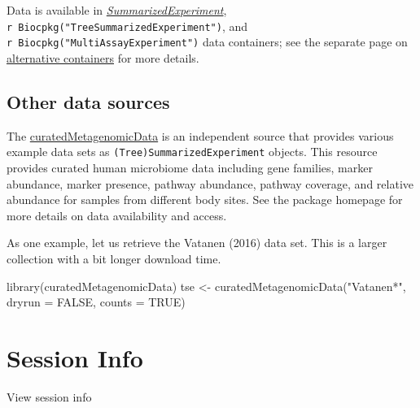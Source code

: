 \documentclass[
]{book}
\newenvironment{Shaded}{\begin{snugshade}}{\end{snugshade}}
\newcommand{\AttributeTok}[1]{\textcolor[rgb]{0.77,0.63,0.00}{#1}}
\newcommand{\ConstantTok}[1]{\textcolor[rgb]{0.00,0.00,0.00}{#1}}
\newcommand{\FunctionTok}[1]{\textcolor[rgb]{0.00,0.00,0.00}{#1}}
\newcommand{\NormalTok}[1]{#1}
\newcommand{\OtherTok}[1]{\textcolor[rgb]{0.56,0.35,0.01}{#1}}
\newcommand{\StringTok}[1]{\textcolor[rgb]{0.31,0.60,0.02}{#1}}
\begin{document}
Data is available in \emph{\href{https://bioconductor.org/packages/3.15/SummarizedExperiment}{SummarizedExperiment}}, \texttt{r\ Biocpkg("TreeSummarizedExperiment")}, and \texttt{r\ Biocpkg("MultiAssayExperiment")} data containers; see the separate
page on \href{https://microbiome.github.io/OMA/multitable.html}{alternative
containers} for more
details.

\hypertarget{other-data-sources}{%
\subsection{Other data sources}\label{other-data-sources}}

The
\href{https://waldronlab.io/curatedMetagenomicData}{curatedMetagenomicData}
is an independent source that provides various example data sets as
\texttt{(Tree)SummarizedExperiment} objects. This resource provides curated
human microbiome data including gene families, marker abundance,
marker presence, pathway abundance, pathway coverage, and relative
abundance for samples from different body sites. See the package
homepage for more details on data availability and access.

As one example, let us retrieve the Vatanen (2016) \citep{Vatanen2016} data
set. This is a larger collection with a bit longer download time.

\begin{Shaded}
\begin{Highlighting}[]
\FunctionTok{library}\NormalTok{(curatedMetagenomicData)}
\NormalTok{tse }\OtherTok{\textless{}{-}} \FunctionTok{curatedMetagenomicData}\NormalTok{(}\StringTok{"Vatanen*"}\NormalTok{, }\AttributeTok{dryrun =} \ConstantTok{FALSE}\NormalTok{, }\AttributeTok{counts =} \ConstantTok{TRUE}\NormalTok{)}
\end{Highlighting}
\end{Shaded}

\hypertarget{session-info}{%
\section*{Session Info}\label{session-info}}

View session info
\end{document}
